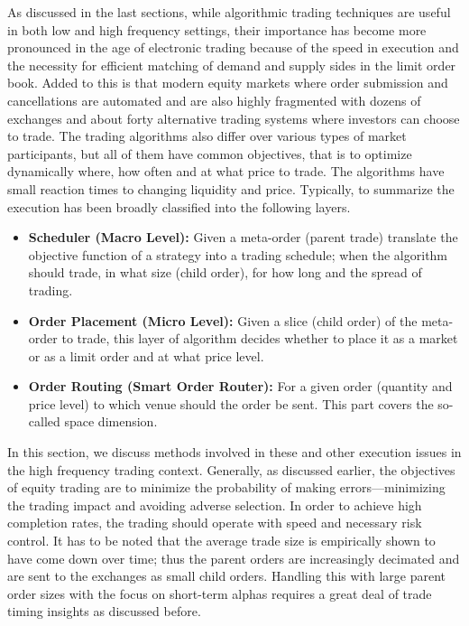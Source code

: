 As discussed in the last sections, while algorithmic trading techniques are useful in both low and high frequency settings, their importance has become more pronounced in the age of electronic trading because of the speed in execution and the necessity for efficient matching of demand and supply sides in the limit order book. Added to this is that modern equity markets where order submission and cancellations are automated and are also highly fragmented with dozens of exchanges and about forty alternative trading systems where investors can choose to trade. The trading algorithms also differ over various types of market participants, but all of them have common objectives, that is to optimize dynamically where, how often and at what price to trade. The algorithms have small reaction times to changing liquidity and price. Typically, to summarize the execution has been broadly classified into the following layers.
	\begin{itemize}
	\item \textbf{Scheduler (Macro Level):} Given a meta-order (parent trade) translate the objective function of a strategy into a trading schedule; when the algorithm should trade, in what size (child order), for how long and the spread of trading.
	
	\item \textbf{Order Placement (Micro Level):} Given a slice (child order) of the meta-order to trade, this layer of algorithm decides whether to place it as a market or as a  limit order and at what price level.
	
	\item \textbf{Order Routing (Smart Order Router):} For a given order (quantity and price level) to which venue should the order be sent. This part covers the so-called space dimension.
	\end{itemize}


In this section, we discuss methods involved in these and other execution issues in the high frequency trading context. Generally, as discussed earlier, the objectives of equity trading are to minimize the probability of making errors---minimizing the trading impact and avoiding adverse selection. In order to achieve high completion rates, the trading should operate with speed and necessary risk control. It has to be noted that the average trade size is empirically shown to have come down over time; thus the parent orders are increasingly decimated and are sent to the exchanges as small child orders. Handling this with large parent order sizes with the focus on short-term alphas requires a great deal of trade timing insights as discussed before.


